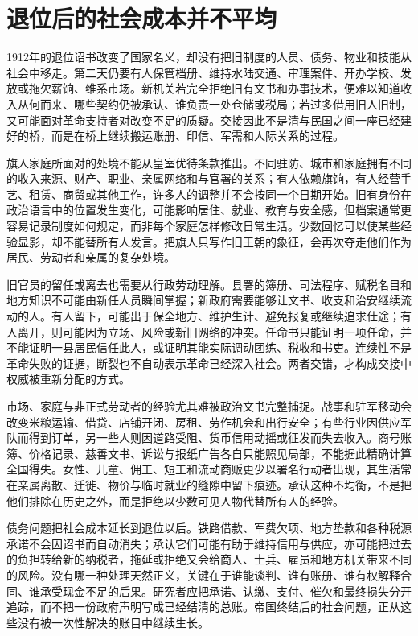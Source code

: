 \section{退位后的社会成本并不平均}

1912年的退位诏书改变了国家名义，却没有把旧制度的人员、债务、物业和技能从社会中移走。第二天仍要有人保管档册、维持水陆交通、审理案件、开办学校、发放或拖欠薪饷、维系市场。新机关若完全拒绝旧有文书和办事技术，便难以知道收入从何而来、哪些契约仍被承认、谁负责一处仓储或税局；若过多借用旧人旧制，又可能面对革命支持者对改变不足的质疑。交接因此不是清与民国之间一座已经建好的桥，而是在桥上继续搬运账册、印信、军需和人际关系的过程。

旗人家庭所面对的处境不能从皇室优待条款推出。不同驻防、城市和家庭拥有不同的收入来源、财产、职业、亲属网络和与官署的关系；有人依赖旗饷，有人经营手艺、租赁、商贸或其他工作，许多人的调整并不会按同一个日期开始。旧有身份在政治语言中的位置发生变化，可能影响居住、就业、教育与安全感，但档案通常更容易记录制度如何规定，而非每个家庭怎样修改日常生活。少数回忆可以使某些经验显影，却不能替所有人发言。把旗人只写作旧王朝的象征，会再次夺走他们作为居民、劳动者和亲属的复杂处境。

旧官员的留任或离去也需要从行政劳动理解。县署的簿册、司法程序、赋税名目和地方知识不可能由新任人员瞬间掌握；新政府需要能够让文书、收支和治安继续流动的人。有人留下，可能出于保全地方、维护生计、避免报复或继续追求仕途；有人离开，则可能因为立场、风险或新旧网络的冲突。任命书只能证明一项任命，并不能证明一县居民信任此人，或证明其能实际调动团练、税收和书吏。连续性不是革命失败的证据，断裂也不自动表示革命已经深入社会。两者交错，才构成交接中权威被重新分配的方式。

市场、家庭与非正式劳动者的经验尤其难被政治文书完整捕捉。战事和驻军移动会改变米粮运输、借贷、店铺开闭、房租、劳作机会和出行安全；有些行业因供应军队而得到订单，另一些人则因道路受阻、货币信用动摇或征发而失去收入。商号账簿、价格记录、慈善文书、诉讼与报纸广告各自只能照见局部，不能据此精确计算全国得失。女性、儿童、佣工、短工和流动商贩更少以署名行动者出现，其生活常在亲属离散、迁徙、物价与临时就业的缝隙中留下痕迹。承认这种不均衡，不是把他们排除在历史之外，而是拒绝以少数可见人物代替所有人的经验。

债务问题把社会成本延长到退位以后。铁路借款、军费欠项、地方垫款和各种税源承诺不会因诏书而自动消失；承认它们可能有助于维持信用与供应，亦可能把过去的负担转给新的纳税者，拖延或拒绝又会给商人、士兵、雇员和地方机关带来不同的风险。没有哪一种处理天然正义，关键在于谁能谈判、谁有账册、谁有权解释合同、谁承受现金不足的后果。研究者应把承诺、认缴、支付、催欠和最终损失分开追踪，而不把一份政府声明写成已经结清的总账。帝国终结后的社会问题，正从这些没有被一次性解决的账目中继续生长。

